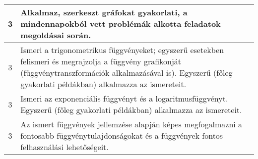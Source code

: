 \begin{longtable}{c | p{12cm} }
                                
                                          3 &  Alkalmaz, szerkeszt gráfokat gyakorlati, a mindennapokból vett problémák alkotta feladatok megoldásai során. \\ \hline
                                          3 &  Ismeri a trigonometrikus függvényeket; egyszerű esetekben felismeri és megrajzolja a függvény grafikonját (függvénytranszformációk alkalmazásával is). Egyszerű (főleg gyakorlati példákban) alkalmazza az ismereteit. \\ \hline
                                          3 &  Ismeri az exponenciális függvényt és a logaritmusfüggvényt. Egyszerű (főleg gyakorlati példákban) alkalmazza az ismereteit. \\ \hline
                                          3 &  Az ismert függvények jellemzése alapján képes megfogalmazni a fontosabb függvénytulajdonságokat és a függvények fontos felhasználási lehetőségeit. \\ \hline
                                      

\end{longtable}
